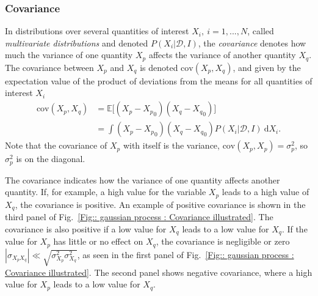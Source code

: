 \documentclass[twoside,english]{uiofysmaster}
\begin{document}
{{%




\subsubsection{Covariance}\label{Sec:: gaussian process : Covariance}




In distributions over several quantities of interest $X_i,~i=1,...,N$, called \textit{multivariate distributions} and denoted $P(X_i| \mathcal{D}, I)$, the \textit{covariance} denotes how much the variance of one quantity $X_p$ affects the variance of another quantity $X_q$. The covariance between $X_p$ and $X_q$ is denoted $\mathrm{cov}(X_p, X_q)$, and given by the expectation value of the product of deviations from the means for all quantities of interest $X_i$ 
\begin{align}\label{Eq:: gaussian process : Covariance definition}
\mathrm{cov}(X_p, X_q) &= \mathbb{E} \big[(X_p - {X_p}_0) (X_q - {X_q}_0) \big] \nonumber \\&=\int (X_p - {X_p}_0) (X_q - {X_q}_0) P (X_i | \mathcal{D}, I) ~\text{d}X_i.
\end{align}
Note that the covariance of $X_p$ with itself is the variance, $\mathrm{cov}(X_p, X_p) = \sigma_p^2$, so $\sigma_p^2$ is on the diagonal.

The covariance indicates how the variance of one quantity affects another quantity. If, for example, a high value for the variable $X_p$ leads to a high value of $X_q$, the covariance is positive. An example of positive covariance is shown in the third panel of Fig.~\ref{Fig:: gaussian process : Covariance illustrated}. The covariance is also positive if a low value for $X_q$ leads to a low value for $X_q$. If the value for $X_p$ has little or no effect on $X_q$, the covariance is negligible or zero $|\sigma_{X_pX_q}| \ll \sqrt{\sigma_{X_p}^2 \sigma_{X_q}^2}$, as seen in the first panel of Fig.~\ref{Fig:: gaussian process : Covariance illustrated}. The second panel shows negative covariance, where a high value for $X_p$ leads to a low value for $X_q$.


}}
\end{document}
